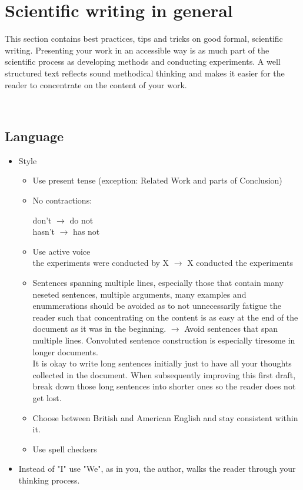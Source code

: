 \documentclass[twocolumn]{mlai-guide}
\newcommand{\cmark}{\textcolor[rgb]{0,0.9,0}{\ding{52}}}%
\newcommand{\xmark}{\textcolor[rgb]{0.9,0,0}{\ding{56}}}%
\newcommand{\eg}[2]{ \xmark #1 $\rightarrow$ \cmark #2}
\begin{document}
\section{Scientific writing in general}
This section contains best practices, tips and tricks on good formal, scientific writing. Presenting your work in an accessible way is as much part of the scientific process as developing methods and conducting experiments. A well structured text reflects sound methodical thinking and makes it easier for the reader to concentrate on the content of your work. \cite{zobel_writing}

\

\subsection{Language}
\begin{itemize}

	\item Style
	\begin{itemize}
		\item Use present tense (exception: Related Work and parts of Conclusion)
		\item No contractions:
		\begin{center}
			\eg{don't}{do not}\\
			\eg{hasn't}{has not }
		\end{center}
		\item Use active voice \\\eg{the experiments were conducted by X}{X conducted the experiments}
		\item \eg{Sentences spanning multiple lines, especially those that contain many neseted sentences, multiple arguments, many examples and enummerations should be avoided as to not unnecessarily fatigue the reader such that concentrating on the content is as easy at the end of the document as it was in the beginning.}{Avoid sentences that span multiple lines. Convoluted sentence construction is especially tiresome in longer documents.}\\ It is okay to write long sentences initially just to have all your thoughts collected in the document. When subsequently improving this first draft, break down those long sentences into shorter ones so the reader does not get lost.
		\item Choose between British and American English and stay consistent within it.
		\item Use spell checkers
	\end{itemize}
	\item Instead of "I" use "We", as in you, the author, walks the reader through your thinking process.
\end{itemize}
\end{document}
